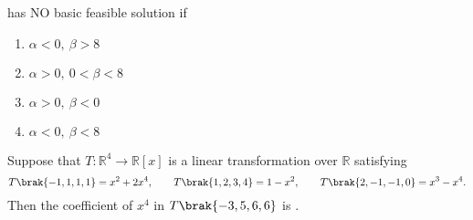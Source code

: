 has NO basic feasible solution if
\hfill{}
\begin{multicols}{2}
\begin{enumerate}
\item $\alpha<0,\ \beta>8$
\item $\alpha>0,\ 0<\beta<8$
\item $\alpha>0,\ \beta<0$
\item $\alpha<0,\ \beta<8$
\end{enumerate}
\end{multicols}
\item Suppose that $T\colon \mathbb{R}^{4}\to \mathbb{R}[x]$ is a linear transformation over $\mathbb{R}$ satisfying
\[
T\brak{-1,1,1,1}=x^{2}+2x^{4},\qquad
T\brak{1,2,3,4}=1-x^{2},\qquad
T\brak{2,-1,-1,0}=x^{3}-x^{4}.
\]
Then the coefficient of $x^{4}$ in $T\brak{-3,5,6,6}$ is \underline{\hspace{2cm}}.
\hfill{}
